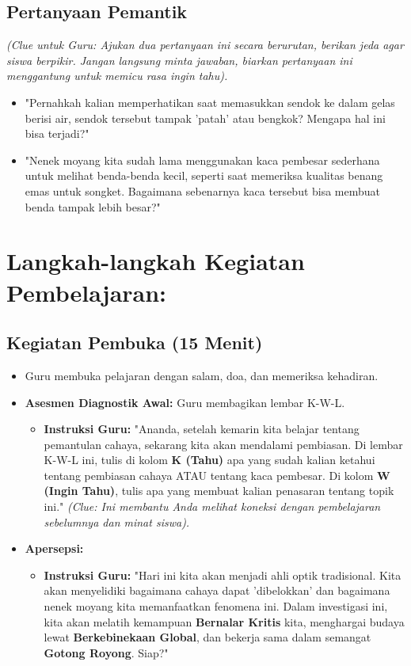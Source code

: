 \documentclass[12pt,a4paper]{article}
\begin{document}
\subsection{Pertanyaan Pemantik}
\textit{(Clue untuk Guru: Ajukan dua pertanyaan ini secara berurutan, berikan jeda agar siswa berpikir. Jangan langsung minta jawaban, biarkan pertanyaan ini menggantung untuk memicu rasa ingin tahu).}

\begin{itemize}
\item "Pernahkah kalian memperhatikan saat memasukkan sendok ke dalam gelas berisi air, sendok tersebut tampak 'patah' atau bengkok? Mengapa hal ini bisa terjadi?"
\item "Nenek moyang kita sudah lama menggunakan kaca pembesar sederhana untuk melihat benda-benda kecil, seperti saat memeriksa kualitas benang emas untuk songket. Bagaimana sebenarnya kaca tersebut bisa membuat benda tampak lebih besar?"
\end{itemize}

\section{Langkah-langkah Kegiatan Pembelajaran:}

\subsection{Kegiatan Pembuka (15 Menit)}
\begin{itemize}
\item Guru membuka pelajaran dengan salam, doa, dan memeriksa kehadiran.
\item \textbf{Asesmen Diagnostik Awal:} Guru membagikan lembar K-W-L.
    \begin{itemize}
    \item \textbf{Instruksi Guru:} "Ananda, setelah kemarin kita belajar tentang pemantulan cahaya, sekarang kita akan mendalami pembiasan. Di lembar K-W-L ini, tulis di kolom \textbf{K (Tahu)} apa yang sudah kalian ketahui tentang pembiasan cahaya ATAU tentang kaca pembesar. Di kolom \textbf{W (Ingin Tahu)}, tulis apa yang membuat kalian penasaran tentang topik ini." \textit{(Clue: Ini membantu Anda melihat koneksi dengan pembelajaran sebelumnya dan minat siswa).}
    \end{itemize}
\item \textbf{Apersepsi:}
    \begin{itemize}
    \item \textbf{Instruksi Guru:} "Hari ini kita akan menjadi ahli optik tradisional. Kita akan menyelidiki bagaimana cahaya dapat 'dibelokkan' dan bagaimana nenek moyang kita memanfaatkan fenomena ini. Dalam investigasi ini, kita akan melatih kemampuan \textbf{Bernalar Kritis} kita, menghargai budaya lewat \textbf{Berkebinekaan Global}, dan bekerja sama dalam semangat \textbf{Gotong Royong}. Siap?"
    \end{itemize}
\end{itemize}
\end{document}
